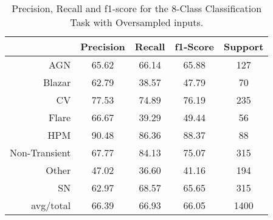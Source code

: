 \begin{table}
\centering
\begin{tabular}{|r|c|c|c|c|}
\hline
\multicolumn{1}{|l|}{} & Precision & Recall & f1-Score & Support \\ \hline \hline
AGN                    & 65.62              & 66.14             & 65.88             & 127             \\ \hline
Blazar                 & 62.79           & 38.57          & 47.79          & 70          \\ \hline
CV                     & 77.53               & 74.89              & 76.19              & 235              \\ \hline
Flare                  & 66.67            & 39.29           & 49.44           & 56           \\ \hline
HPM                    & 90.48              & 86.36             & 88.37             & 88             \\ \hline
Non-Transient          & 67.77    & 84.13   & 75.07   & 315   \\ \hline
Other                  & 47.02            & 36.60           & 41.16           & 194           \\ \hline
SN                     & 62.97               & 68.57              & 65.65              & 315              \\ \hline
avg/total              & 66.39            & 66.93           & 66.05           & 1400           \\ \hline
\end{tabular}
\caption{Precision, Recall and f1-score for the 8-Class Classification Task with Oversampled inputs.}
\label{Overall-Scores-8-Class-Oversampled}
\end{table}
